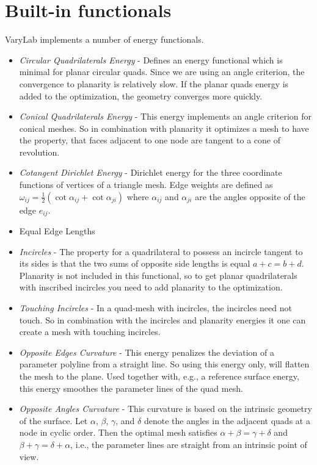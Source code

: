 \documentclass[Thesis.tex]{subfiles}
\begin{document}
\section{Built-in functionals}

{\sc VaryLab} implements a number of energy functionals.

\begin{itemize}
\item \emph{Circular Quadrilaterals Energy} - Defines an energy functional which is minimal for planar circular quads. Since we are using an angle criterion, the convergence to planarity is relatively slow. If the planar quads energy is added to the optimization, the geometry converges more quickly.
\item \emph{Conical Quadrilaterals Energy} - This energy implements an angle criterion for conical meshes. So in combination with planarity it optimizes a mesh to have the property, that faces adjacent to one node are tangent to a cone of revolution.
\item \emph{Cotangent Dirichlet Energy} - Dirichlet energy for the three coordinate functions of vertices of a triangle mesh. Edge weights are defined as $\omega_\mathit{ij}=\frac{1}{2}(\cot\alpha_\mathit{ij}+\cot\alpha_\mathit{ji})$ where $\alpha_\mathit{ij}$ and $\alpha_\mathit{ji}$ are the angles opposite of the edge $e_\mathit{ij}$.
\item Equal Edge Lengths
\item \emph{Incircles} - The property for a quadrilateral to possess an incircle tangent to its sides is that the two sums of opposite side lengths is equal $a+c=b+d$. Planarity is not included in this functional, so to get planar quadrilaterals with inscribed incircles you need to add planarity to the optimization.
\item \emph{Touching Incircles} - In a quad-mesh with incircles, the incircles need not touch. So in combination with the incircles and planarity energies it one can create a mesh with touching incircles.
\item \emph{Opposite Edges Curvature} - This energy penalizes the deviation of a parameter polyline from a straight line. So using this energy only, will flatten the mesh to the plane. Used together with, e.g., a reference surface energy, this energy smoothes the  parameter lines of the quad mesh.
\item \emph{Opposite Angles Curvature} - This curvature is based on the intrinsic geometry of the surface. Let $\alpha$, $\beta$, $\gamma$, and $\delta$ denote the angles in the adjacent quads at a node in cyclic order. Then the optimal mesh satisfies $\alpha+\beta=\gamma+\delta$ and $\beta+\gamma=\delta+\alpha$, i.e., the parameter lines are straight from an intrinsic point of view.

\end{itemize}
\end{document}
